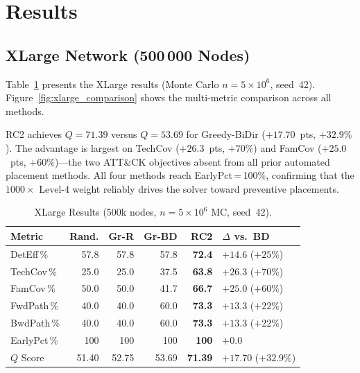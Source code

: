 \documentclass[journal]{IEEEtran}
\begin{document}
\section{Results}
\label{sec:results}

\subsection{XLarge Network (500\,000 Nodes)}
\label{sec:results:xlarge}

Table~\ref{tab:xlarge} presents the XLarge results (Monte Carlo
$n=5\times10^6$, seed~42). Figure~\ref{fig:xlarge_comparison} shows
the multi-metric comparison across all methods.

RC2 achieves $Q=71.39$ versus $Q=53.69$ for Greedy-BiDir
($+17.70$~pts, $+32.9\%$). The advantage is largest on TechCov
($+26.3$~pts, $+70\%$) and FamCov ($+25.0$~pts, $+60\%$)---the two
ATT\&CK objectives absent from all prior automated placement methods.
All four methods reach EarlyPct\,=\,100\%, confirming that the
$1000\times$ Level-4 weight reliably drives the solver toward
preventive placements.

\begin{table}[!htb]
\caption{XLarge Results (500k nodes, $n=5{\times}10^6$ MC, seed~42).}
\label{tab:xlarge}
\centering
\renewcommand{\arraystretch}{1.2}
\begin{tabular}{lrrrrl}
\toprule
Metric & Rand. & Gr-R & Gr-BD & \textbf{RC2} & $\Delta$ vs.\ BD \\
\midrule
DetEff\,\%  & 57.8 & 57.8 & 57.8 & \textbf{72.4} & $+14.6$ ($+25\%$) \\
TechCov\,\% & 25.0 & 25.0 & 37.5 & \textbf{63.8} & $+26.3$ ($+70\%$) \\
FamCov\,\%  & 50.0 & 50.0 & 41.7 & \textbf{66.7} & $+25.0$ ($+60\%$) \\
FwdPath\,\% & 40.0 & 40.0 & 60.0 & \textbf{73.3} & $+13.3$ ($+22\%$) \\
BwdPath\,\% & 40.0 & 40.0 & 60.0 & \textbf{73.3} & $+13.3$ ($+22\%$) \\
EarlyPct\,\%& 100  & 100  & 100  & \textbf{100}  & $+0.0$ \\
\midrule
$Q$ Score & 51.40 & 52.75 & 53.69 & \textbf{71.39} & $+17.70$ ($+32.9\%$)\\
\bottomrule
\end{tabular}
\end{table}
\end{document}

